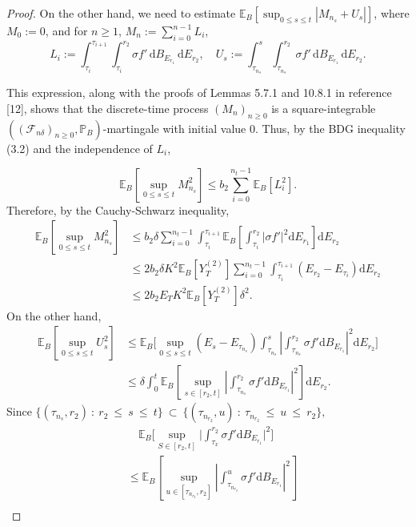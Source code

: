 \documentclass[10pt,reqno,final]{amsart}
\theoremstyle{plain}
\theoremstyle{definition}
\theoremstyle{remark}
\numberwithin{equation}{section}
\numberwithin{figure}{section}
\numberwithin{table}{section}
\begin{document}
\begin{proof}
On the other hand, we need to estimate $\mathbb{E}_B \left[\sup_{0 \leq s \leq t} |M_{n_s} + U_s|\right]$, where $M_0 := 0$, and for $n \geq 1$, $M_n := \sum_{i=0}^{n-1} L_i$,
$$
L_i := \int_{\tau_i}^{\tau_{i+1}} \int_{\tau_i}^{r_2} \sigma f' \, \mathrm{d}B_{E_{r_1}} \, \mathrm{d}E_{r_2}, \quad U_s := \int_{\tau_{n_s}}^s \int_{\tau_{n_s}}^{r_2} \sigma f' \, \mathrm{d}B_{E_{r_1}} \, \mathrm{d}E_{r_2}.
$$

This expression, along with the proofs of Lemmas 5.7.1 and 10.8.1 in reference [12], shows that the discrete-time process $(M_n)_{n \geq 0}$ is a square-integrable $((\mathcal{F}_{n\delta})_{n \geq 0}, \mathbb{P}_B)$-martingale with initial value 0. Thus, by the BDG inequality (3.2) and the independence of $L_i$,

$$
\mathbb{E}_B \left[\sup_{0 \leq s \leq t} M_{n_s}^2\right] \leq b_2 \sum_{i=0}^{n_t-1} \mathbb{E}_B [L_i^2].
$$
Therefore, by the Cauchy-Schwarz inequality,
\begin{align}
	\mathbb{E}_B\left[\sup_{0\leq s\leq t}M_{n_s}^2\right] 
	&\leq b_2\delta\sum_{i=0}^{n_t-1}\int_{\tau_i}^{\tau_{i+1}}\mathbb{E}_B
	\left[\int_{\tau_i}^{r_2}\left|\sigma f'\right|^2\mathrm{d}E_{r_1}\right]
	\mathrm{d}E_{r_2} \nonumber \\
	&\leq2b_2\delta K^2\mathbb{E}_B[Y_T^{(2)}]\sum_{i=0}^{n_t-1}\int_{\tau_i}^
	{\tau_{i+1}}(E_{r_2}-E_{\tau_i})\mathrm{d}E_{r_2} \nonumber \\
	&\leq 2b_2E_TK^2\mathbb{E}_B[Y_T^{(2)}]\delta^2. \label{I221}
\end{align}
On the other hand, 
\begin{align}
	\mathbb{E}_B\left[\sup_{0\leq s\leq t}U_s^2\right]  
	&\leq\mathbb{E}_B\biggl[\sup_{0\leq s\leq t}(E_s-E_{\tau_{n_s}})\int_{\tau_{n_s}}^s\left|\int_{\tau_{n_s}}^{r_2}\sigma f'\mathrm{d}B_{E_{r_1}}\right|^2\mathrm{d}E_{r_2}\biggr] \nonumber \\ &\leq\delta\int_0^t\mathbb{E}_B\left[\sup_{s\in[r_2,t]}\left|\int_{\tau_{n_s}}^{r_2}\sigma f'\mathrm{d}B_{E_{r_1}}\right|^2\right]\mathrm{d}E_{r_2}.\label{I222}
\end{align}
Since $\{(\tau_{n_s},r_2)~:~r_2~\leq~s~\leq~t\}~\subset~\{(\tau_{n_{r_2}},u)~:~\tau_{n_{r_2}}~\leq~u~\leq~r_2\},$
\begin{align*}
	&\quad\mathbb{E}_B\Big[\sup_{S\in[r_2,t]}\Big|\int_{\tau_x}^{r_2}\sigma f'\mathrm{d}B_{E_{r_1}}\Big|^2\Big]  \\
	&\le \mathbb{E}_B\left[\sup_{u\in[\tau_{n_{r_2}},r_2]}\left|\int_{\tau_{n_{r_2}}}^u\sigma f'\mathrm{d}B_{E_{r_1}}\right|^2\right] \\

\end{align*}
\end{proof}
\end{document}
